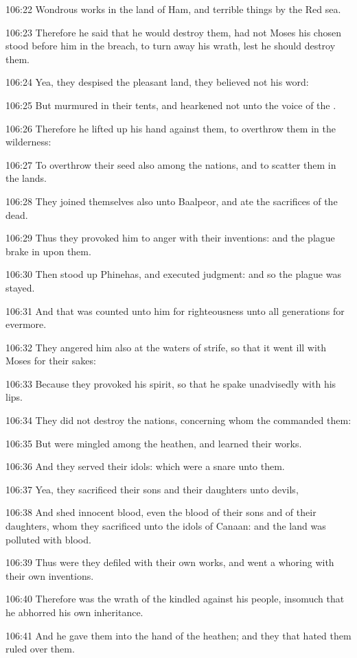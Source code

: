 106:22 Wondrous works in the land of Ham, and terrible things by the Red sea.

106:23 Therefore he said that he would destroy them, had not Moses his chosen stood before him in the breach, to turn away his wrath, lest he should destroy them.

106:24 Yea, they despised the pleasant land, they believed not his word:

106:25 But murmured in their tents, and hearkened not unto the voice of the \LORD.

106:26 Therefore he lifted up his hand against them, to overthrow them in the wilderness:

106:27 To overthrow their seed also among the nations, and to scatter them in the lands.

106:28 They joined themselves also unto Baalpeor, and ate the sacrifices of the dead.

106:29 Thus they provoked him to anger with their inventions: and the plague brake in upon them.

106:30 Then stood up Phinehas, and executed judgment: and so the plague was stayed.

106:31 And that was counted unto him for righteousness unto all generations for evermore.

106:32 They angered him also at the waters of strife, so that it went ill with Moses for their sakes:

106:33 Because they provoked his spirit, so that he spake unadvisedly with his lips.

106:34 They did not destroy the nations, concerning whom the \LORD commanded them:

106:35 But were mingled among the heathen, and learned their works.

106:36 And they served their idols: which were a snare unto them.

106:37 Yea, they sacrificed their sons and their daughters unto devils,

106:38 And shed innocent blood, even the blood of their sons and of their daughters, whom they sacrificed unto the idols of Canaan: and the land was polluted with blood.

106:39 Thus were they defiled with their own works, and went a whoring with their own inventions.

106:40 Therefore was the wrath of the \LORD kindled against his people, insomuch that he abhorred his own inheritance.

106:41 And he gave them into the hand of the heathen; and they that hated them ruled over them.

